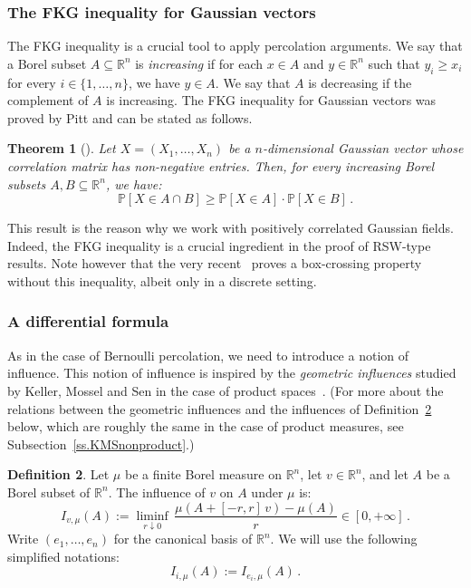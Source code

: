 \documentclass[11pt]{article}
\newtheorem{theo}{Theorem}[section]
\theoremstyle{definition}
\newtheorem{defi}[theo]{Definition}
\numberwithin{equation}{section}
\newcommand{\R}{\mathbb{R}}
\newcommand{\Pro}{\mathbb{P}}
\begin{document}
\subsubsection{The FKG inequality for Gaussian vectors}

The FKG inequality is a crucial tool to apply percolation arguments. We say that a Borel subset $A\subseteq\R^n$ is \emph{increasing} if for each $x \in A$ and $y\in\R^n$ such that $y_i \geq x_i$ for every $i \in \lbrace 1,\dots, n \rbrace$, we have $y \in A$. We say that $A$ is decreasing if the complement of $A$ is increasing. The FKG inequality for Gaussian vectors was proved by Pitt and can be stated as follows.

\begin{theo}[\cite{pitt1982positively}]\label{t.FKG}
Let $X = (X_1,\dots, X_n)$ be a $n$-dimensional Gaussian vector whose correlation matrix has non-negative entries. Then, for every increasing Borel subsets $A,B \subseteq \R^n$, we have:
\[
\Pro \left[X \in A \cap B \right] \geq \Pro \left[X \in A \right] \cdot \Pro \left[X \in B \right] \,.
\]
\end{theo}

This result is the reason why we work with positively correlated Gaussian fields. Indeed, the FKG inequality is a crucial ingredient in the proof of RSW-type results. Note however that the very recent~\cite{bg_17} proves a box-crossing property without this inequality, albeit only in a discrete setting.

\subsubsection{A differential formula}\label{sss.russo}

As in the case of Bernoulli percolation, we need to introduce a notion of influence. This notion of influence is inspired by the \emph{geometric influences} studied by Keller, Mossel and Sen in the case of product spaces~\cite{keller2012geometric,keller2014geometric}. (For more about the relations between the geometric influences and the influences of Definition~\ref{d.infl} below, which are roughly the same in the case of product measures, see Subsection~\ref{ss.KMSnonproduct}.)

\begin{defi}\label{d.infl}
Let $\mu$ be a finite Borel measure on $\R^n$, let $v \in \R^n$, and let $A$ be a Borel subset of $\R^n$. The influence of $v$ on $A$ under $\mu$ is:
\[
I_{v,\mu}(A) := \underset{r \downarrow 0}{\liminf} \, \frac{\mu \left(A + [-r,r] \, v \right) - \mu \left(A \right)}{r} \in [0,+\infty] \,.
\]
Write $\left(e_1,\dots, e_n \right)$ for the canonical basis of $\R^n$. We will use the following simplified notations:
\[
I_{i,\mu}(A) := I_{e_i,\mu}(A) \,.
\]
\end{defi}
\setcounter{section}{2}\setcounter{subsection}{5}\setcounter{subsubsection}{2}\setcounter{theo}{18}
\end{document}
